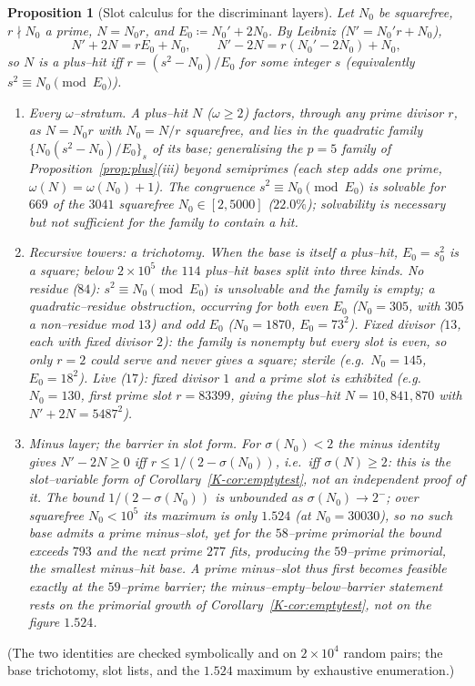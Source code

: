 \documentclass[11pt]{article}
\newtheorem{proposition}[theorem]{Proposition}
\theoremstyle{definition}
\begin{document}
\begin{proposition}[Slot calculus for the discriminant layers]\label{prop:slot}
Let $N_0$ be squarefree, $r\nmid N_0$ a prime, $N=N_0r$, and $E_0\coloneqq N_0'+2N_0$. By Leibniz
($N'=N_0'r+N_0$),
\[ N'+2N=rE_0+N_0,\qquad N'-2N=r(N_0'-2N_0)+N_0, \]
so $N$ is a plus--hit iff $r=(s^2-N_0)/E_0$ for some integer $s$ (equivalently $s^2\equiv N_0\pmod{E_0}$).
\begin{enumerate}[label=\textup{(\alph*)},leftmargin=2.2em]
\item \emph{Every $\omega$--stratum.} A plus--hit $N$ ($\omega\ge2$) factors, through any prime divisor
$r$, as $N=N_0r$ with $N_0=N/r$ squarefree, and lies in the quadratic family
$\{N_0(s^2-N_0)/E_0\}_s$ of its base; generalising the $p=5$ family of
Proposition~\ref{prop:plus}(iii) beyond semiprimes (each step adds one prime,
$\omega(N)=\omega(N_0)+1$). The congruence $s^2\equiv N_0\pmod{E_0}$ is solvable for $669$ of the
$3041$ squarefree $N_0\in[2,5000]$ ($22.0\%$); solvability is necessary but not sufficient for the
family to contain a hit.
\item \emph{Recursive towers: a trichotomy.} When the base is itself a plus--hit, $E_0=s_0^2$ is a
square; below $2\times10^5$ the $114$ plus--hit bases split into three kinds. \emph{No residue} ($84$):
$s^2\equiv N_0\pmod{E_0}$ is unsolvable and the family is empty; a quadratic--residue obstruction,
occurring for both even $E_0$ ($N_0=305$, with $305$ a non--residue mod $13$) and odd $E_0$
($N_0=1870$, $E_0=73^2$). \emph{Fixed divisor} ($13$, each with fixed divisor $2$): the family is
nonempty but every slot is even, so only $r=2$ could serve and never gives a square; sterile (e.g.\
$N_0=145$, $E_0=18^2$). \emph{Live} ($17$): fixed divisor $1$ and a prime slot is exhibited (e.g.\
$N_0=130$, first prime slot $r=83399$, giving the plus--hit $N=10{,}841{,}870$ with $N'+2N=5487^2$).
\item \emph{Minus layer; the barrier in slot form.} For $\sigma(N_0)<2$ the minus identity gives
$N'-2N\ge0$ iff $r\le1/(2-\sigma(N_0))$, i.e.\ iff $\sigma(N)\ge2$: this is the slot--variable form of
Corollary~\ref{K-cor:emptytest}, not an independent proof of it. The bound $1/(2-\sigma(N_0))$ is
unbounded as $\sigma(N_0)\to2^-$; over squarefree $N_0<10^5$ its maximum is only $1.524$ (at
$N_0=30030$), so no such base admits a prime minus--slot, yet for the $58$--prime primorial the bound
exceeds $793$ and the next prime $277$ fits, producing the $59$--prime primorial, the smallest
minus--hit base. A prime minus--slot thus first becomes feasible \emph{exactly} at the $59$--prime
barrier; the minus--empty--below--barrier statement rests on the primorial growth of
Corollary~\ref{K-cor:emptytest}, not on the figure $1.524$.
\end{enumerate}
\end{proposition}
\noindent (The two identities are checked symbolically and on $2\times10^4$ random pairs; the base
trichotomy, slot lists, and the $1.524$ maximum by exhaustive enumeration.)
\end{document}
